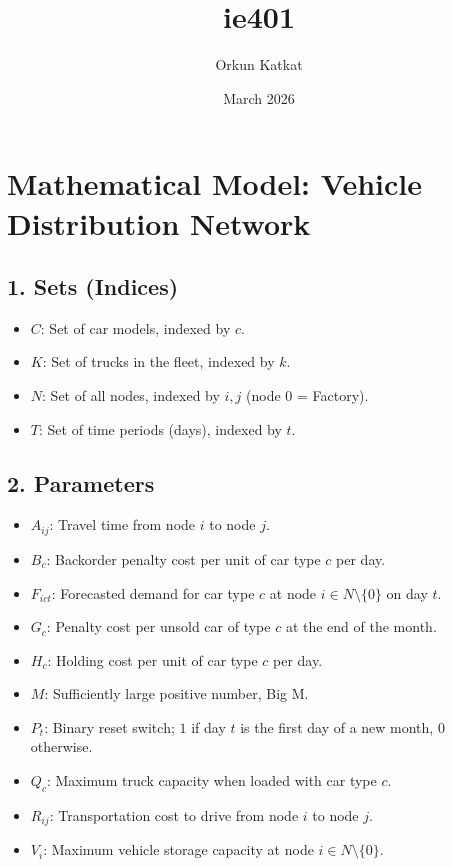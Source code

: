 \documentclass{article}
\title{ie401}
\author{Orkun Katkat}
\date{March 2026}
\begin{document}
\section*{Mathematical Model: Vehicle Distribution Network}

\subsection*{1. Sets (Indices)}
\begin{itemize}
    \item $C$: Set of car models, indexed by $c$.
    \item $K$: Set of trucks in the fleet, indexed by $k$.
    \item $N$: Set of all nodes, indexed by $i, j$ (node $0$ = Factory).
    \item $T$: Set of time periods (days), indexed by $t$.
\end{itemize}

\subsection*{2. Parameters}
\begin{itemize}
    \item $A_{ij}$: Travel time from node $i$ to node $j$.
    \item $B_c$: Backorder penalty cost per unit of car type $c$ per day.
    \item $F_{ict}$: Forecasted demand for car type $c$ at node $i \in N \setminus \{0\}$ on day $t$.
    \item $G_c$: Penalty cost per unsold car of type $c$ at the end of the month.
    \item $H_c$: Holding cost per unit of car type $c$ per day.
    \item $M$: Sufficiently large positive number, Big M.
    \item $P_t$: Binary reset switch; $1$ if day $t$ is the first day of a new month, $0$ otherwise.
    \item $Q_c$: Maximum truck capacity when loaded with car type $c$.
    \item $R_{ij}$: Transportation cost to drive from node $i$ to node $j$.
    \item $V_i$: Maximum vehicle storage capacity at node $i \in N \setminus \{0\}$.
\end{itemize}
\end{document}
